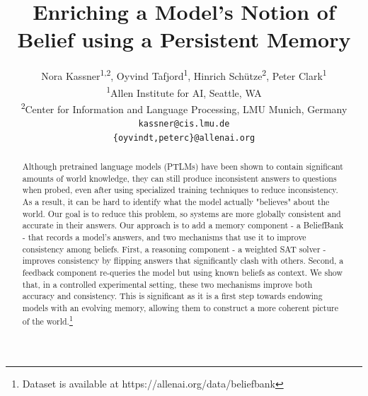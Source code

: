 \documentclass[11pt]{article}
\title{Enriching a Model's Notion of Belief using a Persistent Memory}
\author{Nora Kassner\textsuperscript{1,2},  Oyvind Tafjord\textsuperscript{1}, Hinrich Sch{\"u}tze\textsuperscript{2}, Peter Clark\textsuperscript{1} \\
\textsuperscript{1}Allen Institute for AI, Seattle, WA \\
\textsuperscript{2}Center for Information and Language Processing, 
LMU Munich, Germany \\
\texttt{kassner@cis.lmu.de} \\
\texttt{\{oyvindt,peterc\}@allenai.org} 
}
\newcommand{\nk}[1]{\textcolor{green}{Nora: #1}}
\begin{document}
\maketitle
\begin{abstract}
Although pretrained language models (PTLMs) have been shown to contain significant
amounts of world knowledge, they can still produce inconsistent answers to questions when probed,
even after using specialized training techniques to reduce inconsistency. As a result, it can be
hard to identify what the model actually
"believes" about the world. Our goal is to reduce this problem, so systems are 
more globally consistent and accurate in their answers. Our approach is to add a
memory component - a BeliefBank - that records a model's answers,
and two mechanisms that use it to improve consistency among beliefs. First, a reasoning
component - a weighted SAT solver - improves consistency by flipping
answers that significantly clash with others. Second, a feedback
component re-queries the model but using known beliefs as context.
We show that, in a controlled experimental setting, these two mechanisms
improve both accuracy and consistency. This is significant as it is a
first step towards endowing models with an evolving memory,
allowing them to construct a more coherent picture of the world.\footnote{Dataset is available at https://allenai.org/data/beliefbank}
\end{abstract}
\end{document}
